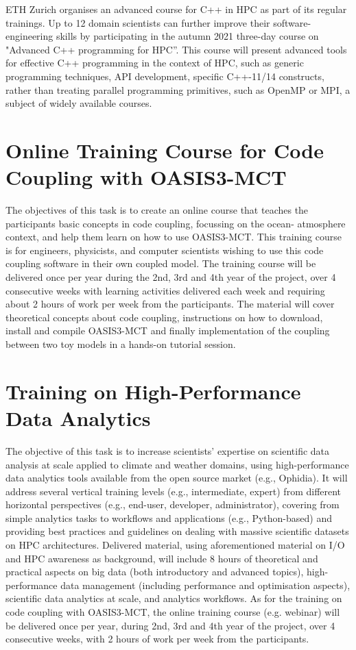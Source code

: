 ETH Zurich organises an advanced course for C++ in HPC as part of its regular trainings. Up to 12 domain scientists can further improve their software-engineering skills by participating in the autumn 2021 three-day course on "Advanced C++ programming for HPC”. This course will present advanced tools for effective C++ programming in the context of HPC, such as generic programming techniques, API development, specific C++-11/14 constructs, rather than treating parallel programming primitives, such as OpenMP or MPI, a subject of widely available courses.

\section{Online Training Course for Code Coupling with OASIS3-MCT}

The objectives of this task is to create an online course that teaches the participants basic concepts in code coupling, focussing on the ocean- atmosphere context, and help them learn on how to use OASIS3-MCT. This training course is for engineers, physicists, and computer scientists wishing to use this code coupling software in their own coupled model. The training course will be delivered once per year during the 2nd, 3rd and 4th year of the project, over 4 consecutive weeks with learning activities delivered each week and requiring about 2 hours of work per week from the participants. The material will cover theoretical concepts about code coupling, instructions on how to download, install and compile OASIS3-MCT and finally implementation of the coupling between two toy models in a hands-on tutorial session.

\section{Training on High-Performance Data Analytics}

The objective of this task is to increase scientists’ expertise on scientific data analysis at scale applied to climate and weather domains, using high-performance data analytics tools available from the open source market (e.g., Ophidia). It will address several vertical training levels (e.g., intermediate, expert) from different horizontal perspectives (e.g., end-user, developer, administrator), covering from simple analytics tasks to workflows and applications (e.g., Python-based) and providing best practices and guidelines on dealing with massive scientific datasets on HPC architectures. Delivered material, using aforementioned material on I/O and HPC awareness as background, will include 8 hours of theoretical and practical aspects on big data (both introductory and advanced topics), high- performance data management (including performance and optimisation aspects), scientific data analytics at scale, and analytics workflows. As for the training on code coupling with OASIS3-MCT, the online training course (e.g. webinar) will be delivered once per year, during 2nd, 3rd and 4th year of the project, over 4 consecutive weeks, with 2 hours of work per week from the participants.


